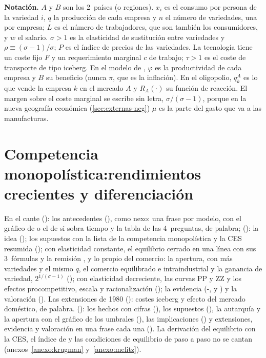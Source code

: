 \documentclass[11pt]{article}
\begin{document}
\begin{anotaciones}
\textbf{Notación.} $A$ y $B$ son los 2~países (o regiones). $x_i$ es el consumo por persona de la variedad $i$, $q$ la producción de cada empresa y $n$ el número de variedades, una por empresa; $L$ es el número de trabajadores, que son también los consumidores, y $w$ el salario. $\sigma>1$ es la elasticidad de sustitución entre variedades y $\rho\equiv(\sigma-1)/\sigma$; $P$ es el índice de precios de las variedades. La tecnología tiene un coste fijo $F$ y un requerimiento marginal $c$ de trabajo; $\tau>1$ es el coste de transporte de tipo iceberg. En el modelo de , $\varphi$ es la productividad de cada empresa y $B$ su beneficio (nunca $\pi$, que es la inflación). En el oligopolio, $q_k^A$ es lo que vende la empresa $k$ en el mercado $A$ y $R_A(\cdot)$ su función de reacción. El margen sobre el coste marginal se escribe sin letra, $\sigma/(\sigma-1)$, porque en la nueva geografía económica (\ref{sec:externas-neg}) $\mu$ es la parte del gasto que va a las manufacturas.
\end{anotaciones}

\section{Competencia monopolística:\newline rendimientos crecientes y diferenciación}\label{sec:competencia-monopolistica}

\begin{notaopositor}
En el cante (): los antecedentes (), como nexo: una frase por modelo, con el gráfico de  o el de  si sobra tiempo y la tabla de las 4~preguntas, de palabra;  (): la idea (); los supuestos con la lista de la competencia monopolística y la CES resumida (); con elasticidad constante, el equilibrio cerrado en una línea con sus 3~fórmulas y la remisión , y lo propio del comercio: la apertura, con más variedades y el mismo $q$, el comercio equilibrado e intraindustrial y la ganancia de variedad, $2^{1/(\sigma-1)}$ (); con elasticidad decreciente, las curvas PP y ZZ y los efectos procompetitivo, escala y racionalización (); la evidencia (-,  y ) y la valoración (). Las extensiones de 1980 (): costes iceberg y efecto del mercado doméstico, de palabra.  (): los hechos con cifras (), los supuestos (), la autarquía y la apertura con el gráfico de los umbrales (), las implicaciones () y extensiones, evidencia y valoración en una frase cada una (). La derivación del equilibrio con la CES, el índice de  y las condiciones de equilibrio de  paso a paso no se cantan (anexos~\ref{anexo:krugman} y~\ref{anexo:melitz}).
\end{notaopositor}
\end{document}
